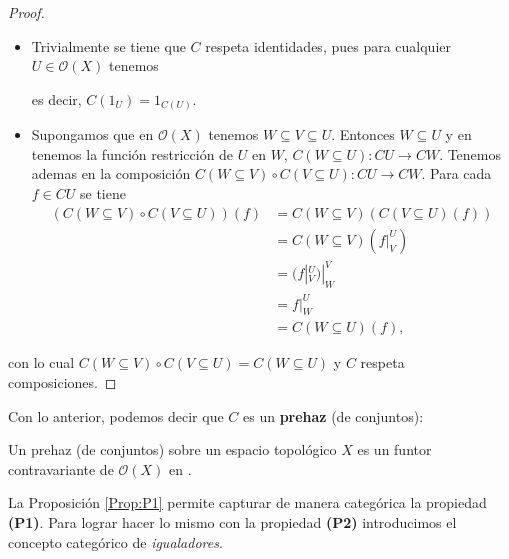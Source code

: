 \begin{proof}
   \begin{itemize}
      \item Trivialmente se tiene que $C$ respeta identidades, pues para cualquier $U\in\mathcal{O}(X)$ tenemos
         
         es decir, $C(1_U)=1_{C(U)}$.
      \item Supongamos que en $\mathcal{O}(X)$ tenemos $W\subseteq V\subseteq U$. Entonces $W\subseteq U$ y en  tenemos la función restricción de $U$ en $W$, $C(W\subseteq U):CU\to CW$. Tenemos ademas en  la composición $C(W\subseteq V)\circ C(V\subseteq U):CU\to CW$. Para cada $f\in CU$ se tiene
         $$
         \begin{aligned}
            (C(W\subseteq V)\circ C(V\subseteq U))(f)&=C(W\subseteq V)(C(V\subseteq U)(f))\\
                                                     &=C(W\subseteq V)(f|^U_V)\\
                                                     &=(f|^U_V)|^V_W\\
                                                     &=f|^U_W\\
                                                     &=C(W\subseteq U)(f),
         \end{aligned}
         $$
      \end{itemize}
      con lo cual $C(W\subseteq V)\circ C(V\subseteq U) = C(W\subseteq U)$ y $C$ respeta composiciones.
\end{proof}
Con lo anterior, podemos decir que $C$ es un \textbf{prehaz} (de conjuntos):
\begin{Def}[Prehaz]
   Un prehaz (de conjuntos) sobre un espacio topológico $X$ es un funtor contravariante de $\mathcal{O}(X)$ en .
\end{Def}
La Proposición \ref{Prop:P1} permite capturar de manera categórica la propiedad \textbf{(P1)}. Para lograr hacer lo mismo con la propiedad \textbf{(P2)} introducimos el concepto categórico de \textit{igualadores}.
